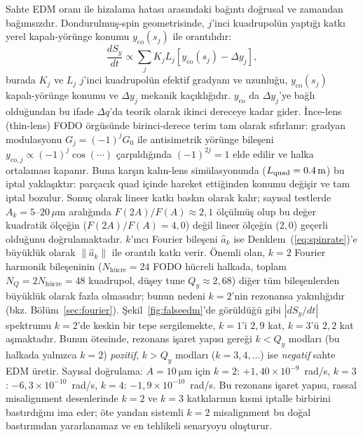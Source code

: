 \documentclass[preprint,12pt]{elsarticle}
\begin{document}
Sahte EDM oranı ile hizalama hatası arasındaki bağıntı doğrusal ve zamandan
bağımsızdır. Dondurulmuş-spin geometrisinde, $j$'inci kuadrupolün yaptığı katkı
yerel kapalı-yörünge konumu $y_\mathrm{co}(s_j)$ ile orantılıdır:
\begin{equation}
  \frac{dS_y}{dt} \propto
  \sum_j K_j L_j \left[y_\mathrm{co}(s_j) - \Delta y_j\right],
  \label{eq:spinrate}
\end{equation}
burada $K_j$ ve $L_j$ $j$'inci kuadrupolün efektif gradyanı ve uzunluğu,
$y_\mathrm{co}(s_j)$ kapalı-yörünge konumu ve $\Delta y_j$ mekanik kaçıklığıdır.
$y_\mathrm{co}$ da $\Delta y_j$'ye bağlı olduğundan bu ifade $\Delta q$'da
teorik olarak ikinci dereceye kadar gider.
İnce-lens (thin-lens) FODO örgüsünde birinci-derece terim tam olarak sıfırlanır:
gradyan modulasyonu $G_j=(-1)^j G_0$ ile antisimetrik yörünge bileşeni
$y_{\mathrm{co},j}\propto(-1)^j\cos(\cdots)$ çarpıldığında $(-1)^{2j}=1$ elde
edilir ve halka ortalaması kapanır.
Buna karşın kalın-lens simülasyonunda ($L_\mathrm{quad}=\SI{0{,}4}{\meter}$) bu
iptal yaklaşıktır: parçacık quad içinde hareket ettiğinden konumu değişir ve tam
iptal bozulur. Sonuç olarak lineer katkı baskın olarak kalır; sayısal testlerde
$A_k=5$--$20\,\mu$m aralığında $F(2A)/F(A)\approx2{,}1$ ölçülmüş olup bu değer
kuadratik ölçeğin ($F(2A)/F(A)=4{,}0$) değil lineer ölçeğin ($2{,}0$) geçerli
olduğunu doğrulamaktadır.
$k$'ıncı Fourier bileşeni $\hat{a}_k$ ise Denklem~(\ref{eq:spinrate})'e
büyüklük olarak $\|\hat{a}_k\|$ ile orantılı katkı verir.
Önemli olan, $k=2$
Fourier harmonik bileşeninin ($N_\mathrm{hücre}=24$ FODO hücreli halkada,
toplam $N_Q=2N_\mathrm{hücre}=48$ kuadrupol, düşey tune $Q_y\approx2{,}68$)
diğer tüm bileşenlerden büyüklük olarak fazla olmasıdır;
bunun nedeni $k=2$'nin rezonansa yakınlığıdır (bkz. Bölüm~\ref{sec:fourier}).
Şekil~\ref{fig:falseedm}'de görüldüğü gibi $|dS_y/dt|$ spektrumu $k=2$'de keskin bir
tepe sergilemekte, $k=1$'i $2{,}9$ kat, $k=3$'ü $2{,}2$ kat aşmaktadır.
Bunun ötesinde, rezonans işaret yapısı gereği $k < Q_y$ modları (bu halkada
yalnızca $k=2$) \emph{pozitif}, $k > Q_y$ modları ($k=3,4,\ldots$) ise
\emph{negatif} sahte EDM üretir.
Sayısal doğrulama: $A=\SI{10}{\micro\meter}$ için $k=2$: $+1{,}40\times10^{-9}$~rad/s,
$k=3$: $-6{,}3\times10^{-10}$~rad/s, $k=4$: $-1{,}9\times10^{-10}$~rad/s.
Bu rezonans işaret yapısı, rassal misalignment desenlerinde $k=2$ ve $k=3$
katkılarının kısmi iptalle birbirini bastırdığını ima eder; öte yandan sistemli
$k=2$ misalignment bu doğal bastırımdan yararlanamaz ve en tehlikeli senaryoyu
oluşturur.
\end{document}
